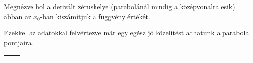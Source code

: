 Megnézve hol a derivált zérushelye (parabolánál mindig a középvonalra esik) abban az $x_\text{0}$-ban kiszámítjuk a függvény értékét.

Ezekkel az adatokkal felvértezve már egy egész jó közelítést adhatunk a parabola pontjaira.

\vskip 100pt

\begin{center}
\begin{tabularx}{\textwidth}{X | X}
	\makecell{$2.5x^2 - 4.5x + 1.8$} & \makecell{$2.5x^2 - 4.5x + 1.8$} \\
	\hline
	\makecell{
		$\begin{array}{rl}
	    & x_\text{1} = 0.6 \\
	    & x_\text{2} = 1.2 \\
	    \hline
	    & m_\text{1} = {M'}_\text{h}(x)|_{x=x_\text{1}} = -\frac{3}{2} \\
			\Rightarrow & m_\text{1} : -\frac{3}{2} \times x + 0.9 \\
				    & m_\text{2} = {M'}_\text{h}(x)|_{x=x_\text{2}} = \frac{3}{2} \\
			\Rightarrow & m_\text{2} : \frac{3}{2} \times x - 1.8 \\
				    & y_\text{0} = M_\text{h}(\frac{x_\text{1} + x_\text{2}}{2}) = -0.225 \\
	    \hline
				    &M'_\text{h}(x^*) = 0 \\
				    &x^* = 0.9 \\
				    &M_\text{h}(x^*) = -0.225
		\end{array}$
	} & 
	\makecell{
		$\begin{array}{rl}
	    & x_\text{1} = 1.2 \\
	    & x_\text{2} = 2.2 \\
	    \hline
	    & m_\text{1} = {M'}_\text{h}(x)|_{x=x_\text{1}} = -\frac{5}{2} \\
			\Rightarrow & m_\text{1} : -\frac{5}{2} \times x + 3 \\
				    & m_\text{2} = {M'}_\text{h}(x)|_{x=x_\text{2}} = \frac{5}{2} \\
			\Rightarrow & m_\text{2} : \frac{5}{2} \times x - 5.5 \\
				    & y_\text{0} = M_\text{h}(\frac{x_\text{1} + x_\text{2}}{2}) = -0.46875 \\
	    \hline
				    &M'_\text{h}(x_\text{0}) = 0 \\
				    &x_\text{0} = 1.7
		\end{array}$
	}
\end{tabularx}
\end{center}

